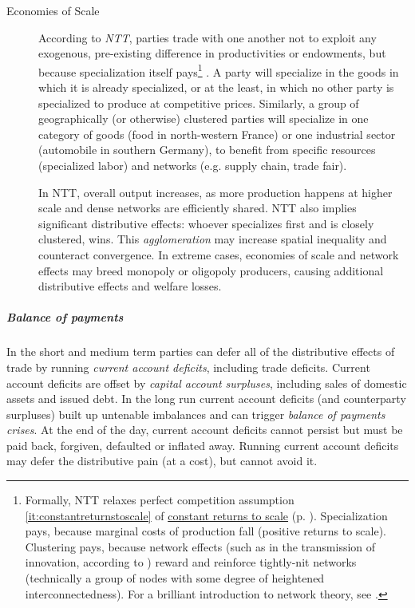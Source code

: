 \begin{description}
	\item[Economies of Scale] \label{it:NTT} According to \emph{\gls{NTT}}, parties trade with one another not to exploit any exogenous, pre-existing difference in productivities or endowments, but because specialization itself pays\footnote{
		Formally, \gls{NTT} relaxes perfect competition assumption \ref{it:constantreturnstoscale} of \hyperref[it:constantreturnstoscale]{constant returns to scale} (p. \pageref{it:constantreturnstoscale}). Specialization pays, because marginal costs of production fall (positive returns to scale). Clustering pays, because network effects (such as in the transmission of innovation, according to \citealt{Bass1969}) reward and reinforce tightly-nit networks (technically a group of nodes with some degree of heightened interconnectedness). For a brilliant introduction to network theory, see \cite{Kleinberg-2009-oz}.} 
	\citep{Krugman-1980-aa}. A party will specialize in the goods in which it is already specialized, or at the least, in which no other party is specialized to produce at competitive prices. Similarly, a group of geographically (or otherwise) clustered parties will specialize in one category of goods (food in north-western France) or one industrial sector (automobile in southern Germany), to benefit from specific resources (specialized labor) and networks (e.g. supply chain, trade fair).

	In \gls{NTT}, overall output increases, as more production happens at higher scale and dense networks are efficiently shared. \gls{NTT} also implies significant distributive effects: whoever specializes first and is closely clustered, wins. This \emph{agglomeration} may increase spatial inequality and counteract convergence. %
	In extreme cases, economies of scale and network effects may breed monopoly or oligopoly producers, causing additional distributive effects and welfare losses.
\end{description}

\subparagraph{Balance of payments}
In the short and medium term parties can defer all of the distributive effects of trade by running \emph{current account deficits}, including trade deficits. Current account deficits are offset by \emph{capital account surpluses}, including sales of domestic assets and issued debt. In the long run current account deficits (and counterparty surpluses) built up untenable imbalances and can trigger \emph{balance of payments crises}. At the end of the day, current account deficits cannot persist but must be paid back, forgiven, defaulted or inflated away. Running current account deficits may defer the distributive pain (at a cost), but cannot avoid it.

